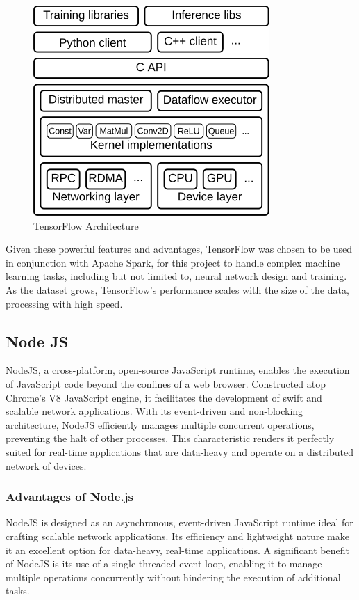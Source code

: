 \begin{figure}[H]
    \centering
    \includegraphics[width=1\linewidth]{images/TensorFlow-architecture.png}
    \caption{TensorFlow Architecture}
    \label{fig:tensorflow-architecture}
\end{figure}

Given these powerful features and advantages, TensorFlow was chosen to be used in conjunction with Apache Spark, for this project to handle complex machine learning tasks, including but not limited to, neural network design and training. 
As the dataset grows, TensorFlow's performance scales with the size of the data, processing with high speed.

\subsection{Node JS}
NodeJS, a cross-platform, open-source JavaScript runtime, enables the execution of JavaScript code beyond the confines of a web browser. Constructed atop Chrome's V8 JavaScript engine, it facilitates the development of swift and scalable network applications. With its event-driven and non-blocking architecture, NodeJS efficiently manages multiple concurrent operations, preventing the halt of other processes. This characteristic renders it perfectly suited for real-time applications that are data-heavy and operate on a distributed network of devices.\cite{nodejs}

\subsubsection*{Advantages of Node.js}
NodeJS is designed as an asynchronous, event-driven JavaScript runtime ideal for crafting scalable network applications. Its efficiency and lightweight nature make it an excellent option for data-heavy, real-time applications.\cite{tilkov}
A significant benefit of NodeJS is its use of a single-threaded event loop, enabling it to manage multiple operations concurrently without hindering the execution of additional tasks.

